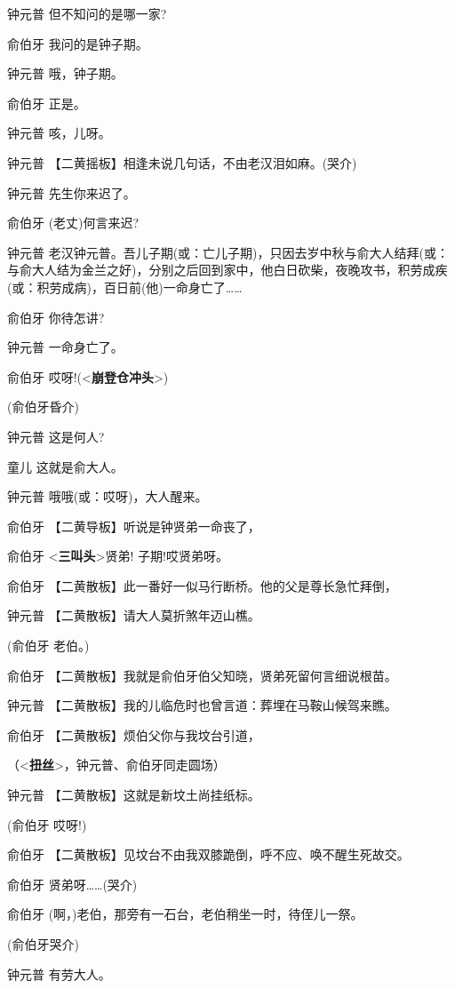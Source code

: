 钟元普 但不知问的是哪一家?

俞伯牙 我问的是钟子期。

钟元普 哦，钟子期。

俞伯牙 正是。

钟元普 咳，儿呀。

钟元普 【二黄摇板】相逢未说几句话，不由老汉泪如麻。(哭介)

钟元普 先生你来迟了。

俞伯牙 (老丈)何言来迟?

钟元普
老汉钟元普。吾儿子期(或：亡儿子期)，只因去岁中秋与俞大人结拜(或：与俞大人结为金兰之好)，分别之后回到家中，他白日砍柴，夜晚攻书，积劳成疾(或：积劳成病)，百日前(他)一命身亡了\ldots{}\ldots{}

俞伯牙 你待怎讲?

钟元普 一命身亡了。

俞伯牙 哎呀!(\textless{}\textbf{崩登仓冲头}\textgreater{})

(俞伯牙昏介)

钟元普 这是何人?

童儿 这就是俞大人。

钟元普 哦哦(或：哎呀)，大人醒来。

俞伯牙 【二黄导板】听说是钟贤弟一命丧了，

俞伯牙 \textless{}\textbf{三叫头}\textgreater{}贤弟! 子期!哎贤弟呀。

俞伯牙 【二黄散板】此一番好一似马行断桥。他的父是尊长急忙拜倒，

钟元普 【二黄散板】请大人莫折煞年迈山樵。

(俞伯牙 老伯。)

俞伯牙 【二黄散板】我就是俞伯牙伯父知晓，贤弟死留何言细说根苗。

钟元普 【二黄散板】我的儿临危时也曾言道：葬埋在马鞍山候驾来瞧。

俞伯牙 【二黄散板】烦伯父你与我坟台引道，

（\textless{}\textbf{扭丝}\textgreater{}，钟元普、俞伯牙同走圆场）

钟元普 【二黄散板】这就是新坟土尚挂纸标。

(俞伯牙 哎呀!)

俞伯牙 【二黄散板】见坟台不由我双膝跪倒，呼不应、唤不醒生死故交。

俞伯牙 贤弟呀\ldots{}\ldots{}(哭介)

俞伯牙 (啊，)老伯，那旁有一石台，老伯稍坐一时，待侄儿一祭。

(俞伯牙哭介)

钟元普 有劳大人。

